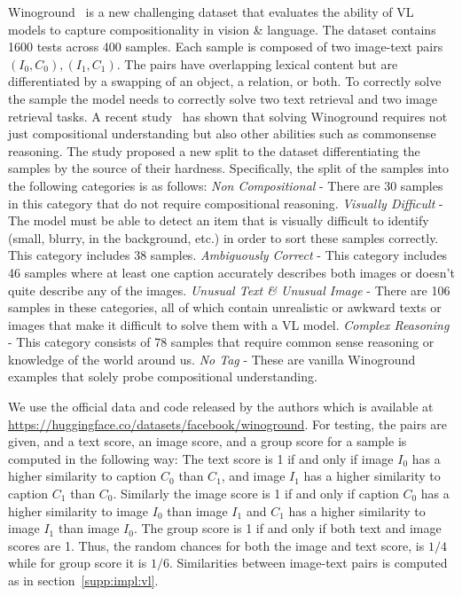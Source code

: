 \documentclass[11pt]{article}
\def\secref#1{section~\ref{#1}}
\newcommand{\minisection}[1]{\noindent{\textbf{#1}.}}
\begin{document}
\minisection{Dataset} Winoground~\cite{winoground} is a new challenging dataset that evaluates the ability of VL models to capture compositionality in vision \& language. The dataset contains 1600 tests across 400 samples. Each sample is composed of two image-text pairs $(I_0,C_0),(I_1,C_1)$. The pairs have overlapping lexical content but are differentiated by a swapping of an object, a relation, or both. To correctly solve the sample the model needs to correctly solve two text retrieval and two image retrieval tasks. A recent study~\cite{Diwan2022WhyIW} has shown that solving  Winoground requires not just compositional understanding but also other abilities such as commonsense reasoning. The study proposed a new split to the dataset differentiating the samples by the source of their hardness. Specifically, the split of the samples into the following categories is as follows: \emph{Non Compositional} - There are 30 samples in this category that do not require compositional reasoning. \emph{Visually Difficult} - The model must be able to detect an item that is visually difficult to identify (small, blurry, in the background, etc.) in order to sort these samples correctly. This category includes 38 samples. \emph{Ambiguously Correct} - This category includes 46 samples where at least one caption accurately describes both images or doesn't quite describe any of the images. \emph{Unusual Text \& Unusual Image} - There are 106 samples in these categories, all of which contain unrealistic or awkward texts or images that make it difficult to solve them with a VL model. \emph{Complex Reasoning} - This category consists of 78 samples that require common sense reasoning or knowledge of the world around us. \emph{No Tag} - These are vanilla Winoground examples that solely probe compositional understanding.   



\minisection{Inference details} We use the official data and code released by the authors which is available at \url{https://huggingface.co/datasets/facebook/winoground}. For testing, the pairs are given, and a text score, an image score, and a group score for a sample is computed in the following way: The text score is 1 if and only if image $I_0$ has a higher similarity to caption $C_0$ than $C_1$, and image $I_1$ has a higher similarity to caption $C_1$ than $C_0$. Similarly the image score is 1 if and only if caption $C_0$ has a higher similarity to image $I_0$ than image $I_1$ and $C_1$ has a higher similarity to image $I_1$ than image $I_0$. The group score is 1 if and only if both text and image scores are 1. Thus, the random chances for both the image and text score, is $1/4$ while for group score it is $1/6$. Similarities between image-text pairs is computed as in \secref{supp:impl:vl}.
\end{document}
